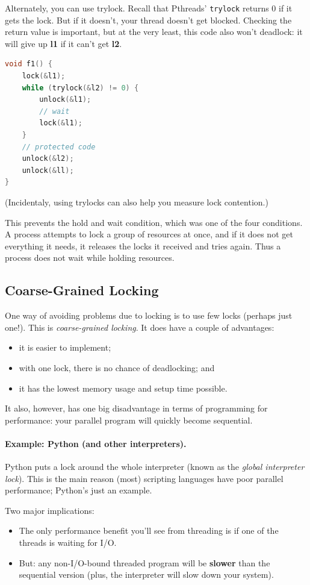\documentclass[a4paper]{report}
\begin{document}
Alternately, you can use trylock. Recall that Pthreads' {\tt trylock}
returns 0 if it gets the lock. But if it doesn't, your thread doesn't get blocked. Checking the return value is important, but at the very least, this code also won't deadlock: it will give up {\bf l1} if it can't get {\bf l2}.
  \begin{lstlisting}[language=C]
void f1() {
    lock(&l1);
    while (trylock(&l2) != 0) {
        unlock(&l1);
        // wait
        lock(&l1);
    }
    // protected code
    unlock(&l2);
    unlock(&ll);    
}
  \end{lstlisting}
  (Incidentaly, using trylocks can also help you measure lock contention.)
  
This prevents the hold and wait condition, which was one of the four conditions. A process attempts to lock a group of resources at once, and if it does not get everything it needs, it releases the locks it received and tries again. Thus a process does not wait while holding resources.

\subsection*{Coarse-Grained Locking}
One way of avoiding problems due to locking is to use few locks
(perhaps just one!). This is \emph{coarse-grained locking}.
It does have a couple of advantages:
  \begin{itemize}
    \item it is easier to implement;
    \item with one lock, there is no chance of deadlocking; and
    \item it has the lowest memory usage and setup time possible.
  \end{itemize}

It also, however, has one big disadvantage in terms of programming for performance: your parallel program will quickly become sequential.

\paragraph{Example: Python (and other interpreters).}
Python puts a lock around the whole interpreter (known as the
\emph{global interpreter lock}).  This is the main reason (most)
scripting languages have poor parallel performance; Python's just an
example.

Two major implications:
\begin{itemize}
\item The only performance benefit you'll see from threading is if one of the threads is
      waiting for I/O.
\item But: any non-I/O-bound threaded program will be {\bf slower} than the sequential
      version (plus, the interpreter will slow down your system).
\end{itemize}
\end{document}
